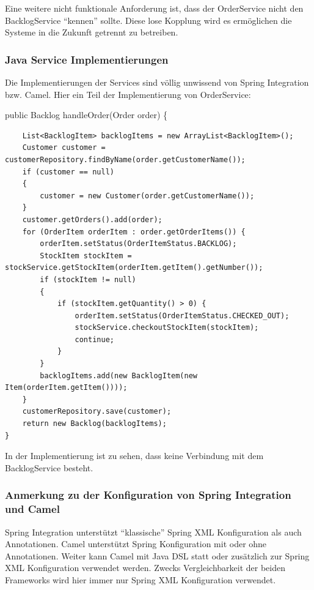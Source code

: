 \documentclass[12pt,a4paper,ngerman]{article}
\begin{document}
Eine weitere nicht funktionale Anforderung ist, dass der OrderService
nicht den BacklogService ``kennen'' sollte. Diese lose Kopplung wird es
ermöglichen die Systeme in die Zukunft getrennt zu betreiben.

\subsubsection{Java Service Implementierungen}

Die Implementierungen der Services sind völlig unwissend von Spring
Integration bzw. Camel. Hier ein Teil der Implementierung von
OrderService:

public Backlog handleOrder(Order order) \{

\begin{lstlisting}
    List<BacklogItem> backlogItems = new ArrayList<BacklogItem>();
    Customer customer = customerRepository.findByName(order.getCustomerName());
    if (customer == null)
    {
        customer = new Customer(order.getCustomerName());
    }
    customer.getOrders().add(order);
    for (OrderItem orderItem : order.getOrderItems()) {
        orderItem.setStatus(OrderItemStatus.BACKLOG);
        StockItem stockItem = stockService.getStockItem(orderItem.getItem().getNumber());
        if (stockItem != null)
        {
            if (stockItem.getQuantity() > 0) {
                orderItem.setStatus(OrderItemStatus.CHECKED_OUT);
                stockService.checkoutStockItem(stockItem);
                continue;
            }
        }
        backlogItems.add(new BacklogItem(new Item(orderItem.getItem())));
    }
    customerRepository.save(customer);
    return new Backlog(backlogItems);
}
\end{lstlisting}

In der Implementierung ist zu sehen, dass keine Verbindung mit dem
BacklogService besteht.

\subsubsection{Anmerkung zu der Konfiguration von Spring Integration und
Camel}

Spring Integration unterstützt ``klassische'' Spring XML Konfiguration
als auch Annotationen. Camel unterstützt Spring Konfiguration mit oder
ohne Annotationen. Weiter kann Camel mit Java DSL statt oder zusätzlich
zur Spring XML Konfiguration verwendet werden. Zwecks Vergleichbarkeit
der beiden Frameworks wird hier immer nur Spring XML Konfiguration
verwendet.
\end{document}
